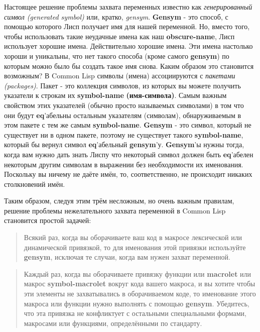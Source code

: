 Настоящее решение проблемы захвата переменных известно как \emph{генерированный символ (generated symbol)} или, кратко, \emph{gensym}. \textbf{Gensym} - это способ, с помощью которого Лисп получает имя для нашей переменной. Но, вместо того, чтобы использовать такие неудачные имена как наш \textbf{obscure-name}, Лисп использует хорошие имена. Действительно хорошие имена. Эти имена настолько хороши и уникальны, что нет такого способа (кроме самого \textbf{gensym}) по которым можно было бы создать такое имя снова. Каким образом это становится возможным? В Common Lisp символы (имена) ассоциируются с \emph{пакетами (packages)}. Пакет - это коллекция символов, из которых вы можете получить указатели к строкам их \textbf{symbol-name} \textbf{(имя-символа)}. Самым важным свойством этих указателей (обычно просто называемых символами) в том что они будут \textbf{eq}'абельны остальным указателям (символам), обнаруживаемым в этом пакете с тем же самым \textbf{symbol-name}. \textbf{Gensym} - это символ, который не существует ни в одном пакете, поэтому не существует такого \textbf{symbol-name}, который бы вернул символ \textbf{eq}'абельный \textbf{gensym}'у. \textbf{Gensym}'ы нужны тогда, когда вам нужно дать знать Лиспу что некоторый символ должен быть \textbf{eq}'абелен некоторым другим символам в выражении без необходимости их именования. Поскольку вы ничему не даёте имён, то, соответственно, не происходит никаких столкновений имён.

Таким образом, следуя этим трём несложным, но очень важным правилам, решение проблемы нежелательного захвата переменной в {Common Lisp} становится простой задачей:

\begin{quote}
Всякий раз, когда вы оборачиваете ваш код в макросе лексической или динамической привязкой, то для именования этой привязки используйте \textbf{gensym}, исключая те случаи, когда вам нужен захват переменной.
\end{quote}

\begin{quote}
Каждый раз, когда вы оборачиваете привязку функции или \textbf{macrolet} или макрос \textbf{symbol-macrolet} вокруг кода вашего макроса, и вы хотите чтобы эти элементы не захватывались в оборачиваемом коде, то именование этого макроса или функции нужно выполнять с помощью \textbf{gensym}. Убедитесь, что эта привязка не конфликтует с остальными специальными формами, макросами или функциями, определёнными по стандарту.
\end{quote}

